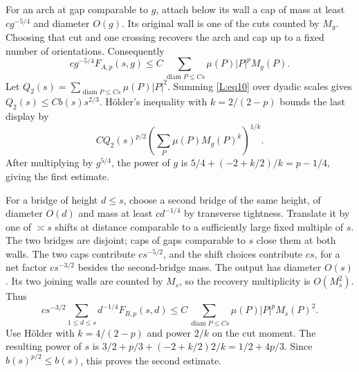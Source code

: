 For an arch at gap comparable to $g$, attach below its wall a cap of
mass at least $cg^{-5/4}$ and diameter $O(g)$.  Its original wall is
one of the cuts counted by $M_g$.  Choosing that cut and one crossing
recovers the arch and cap up to a fixed number of orientations.
Consequently
\[
 c g^{-5/4}F_{A,p}(s,g)
 \le C\sum_{\operatorname{diam}P\le Cs}\mu(P)|P|^p M_g(P).
\]
Let $Q_2(s)=\sum_{\operatorname{diam}P\le Cs}\mu(P)|P|^2$.
Summing \eqref{L:eq10} over dyadic scales gives
$Q_2(s)\le Cb(s)s^{2/3}$.  H\"older's inequality with
$k=2/(2-p)$ bounds the last display by
\[
 C Q_2(s)^{p/2}
 \left(\sum_P\mu(P)M_g(P)^k\right)^{1/k}.
\]
After multiplying by $g^{5/4}$, the power of $g$ is
$5/4+(-2+k/2)/k=p-1/4$, giving the first estimate.

For a bridge of height $d\le s$, choose a second bridge of the same
height, of diameter $O(d)$ and mass at least $cd^{-1/4}$ by transverse
tightness.  Translate it by one of $\asymp s$ shifts at distance
comparable to a sufficiently large fixed multiple of $s$.  The two
bridges are disjoint; caps of gaps comparable to $s$ close them at
both walls.  The two caps contribute $cs^{-5/2}$, and the shift
choices contribute $cs$, for a net factor $cs^{-3/2}$ besides the
second-bridge mass.  The output has diameter $O(s)$.  Its two joining
walls are counted by $M_s$, so the recovery multiplicity is
$O(M_s^2)$.  Thus
\[
 c s^{-3/2}\sum_{1\le d\le s}d^{-1/4}F_{B,p}(s,d)
 \le C\sum_{\operatorname{diam}P\le Cs}\mu(P)|P|^pM_s(P)^2.
\]
Use H\"older with $k=4/(2-p)$ and power $2/k$ on the cut moment.
The resulting power of $s$ is
$3/2+p/3+(-2+k/2)2/k=1/2+4p/3$.
Since $b(s)^{p/2}\le b(s)$, this proves the second estimate.

